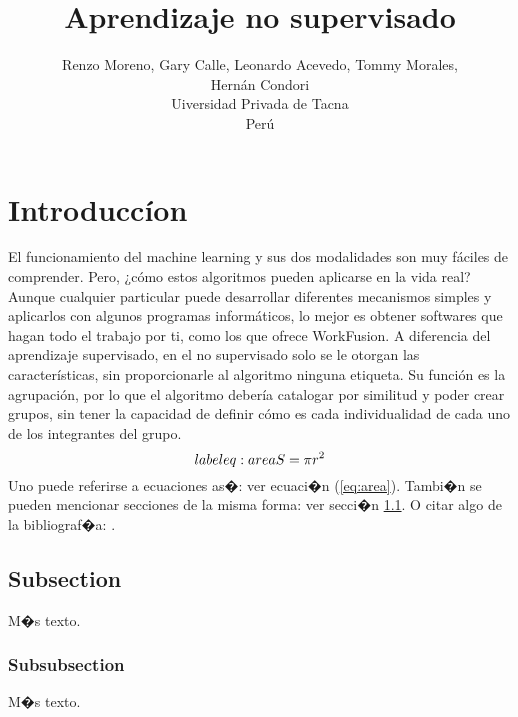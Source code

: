 \documentclass{article}
\title{Aprendizaje no supervisado}
\author{Renzo Moreno, Gary Calle, Leonardo Acevedo, Tommy Morales,\\ Hern\'an Condori \\
  \small Uiversidad Privada de Tacna\\
  \small Per\'u
}
\theoremstyle{definition}
\theoremstyle{remark}
\begin{document}
\maketitle


\section{Introducc\'ion}

El funcionamiento del machine learning y sus dos modalidades son muy fáciles de comprender. Pero, ¿cómo estos algoritmos pueden aplicarse en la vida real? Aunque cualquier particular puede desarrollar diferentes mecanismos simples y aplicarlos con algunos programas informáticos, lo mejor es obtener softwares que hagan todo el trabajo por ti, como los que ofrece WorkFusion.
A diferencia del aprendizaje supervisado, en el no supervisado solo se le otorgan las características, sin proporcionarle al algoritmo ninguna etiqueta. Su función es la agrupación, por lo que el algoritmo debería catalogar por similitud y poder crear grupos, sin tener la capacidad de definir cómo es cada individualidad de cada uno de los integrantes del grupo.
\begin{equation}\\label{eq:area}
  S = \pi r^2
\end{equation}
Uno puede referirse a ecuaciones as�: ver ecuaci�n (\ref{eq:area}).
Tambi�n se pueden mencionar secciones de la misma forma: ver secci�n
\ref{sec:nada}. O citar algo de la bibliograf�a: \cite{Cd94}.

\subsection{Subsection}\label{sec:nada}

M�s texto.

\subsubsection{Subsubsection}\label{sec:nada2}

M�s texto.
\end{document}
